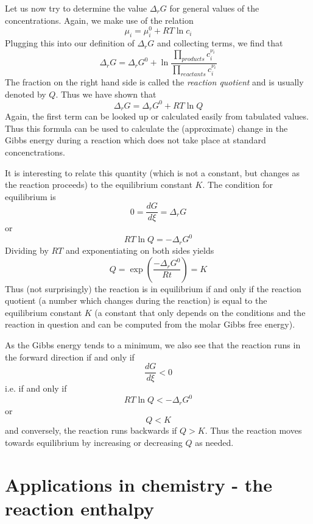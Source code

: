 \documentclass[a4paper, draft]{article}
\theoremstyle{own}
\theoremstyle{remark}
\begin{document}
Let us now try to determine the value $\Delta_r G$ for general values of the concentrations. Again, we make use of the relation
$$
\mu_i = \mu_i^0 + RT \ln c_i
$$
Plugging this into our definition of $\Delta_r G$ and collecting terms, we find that
$$
\Delta_r G = \Delta_r G^0 + \ln \frac{\prod_{products} c_i^{\nu_i}}{\prod_{reactants} c_i^{\nu_i}}
$$
The fraction on the right hand side is called the {\em reaction quotient} and is usually denoted by $Q$. Thus we have shown that
$$
\Delta_r G = \Delta_r G^0 + RT \ln Q
$$
Again, the first term can be looked up or calculated easily from tabulated values. Thus this formula can be used to calculate the (approximate) change in the Gibbs energy during a reaction which does not take place at standard concenctrations.

It is interesting to relate this quantity (which is not a constant, but changes as the reaction proceeds) to the equilibrium constant $K$. The condition for equilibrium is
$$
0 = \frac{dG}{d\xi} = \Delta_r G 
$$
or
$$
RT \ln Q = - \Delta_r G^0 
$$
Dividing by $RT$ and exponentiating on both sides yields
$$
Q = \exp(\frac{- \Delta_r G^0}{Rt}) = K
$$
Thus (not surprisingly) the reaction is in equilibrium if and only if the reaction quotient (a number which changes during the reaction) is equal to the equilibrium constant $K$ (a constant that only depends on the conditions and the reaction in question and can be computed from the molar Gibbs free energy).	

As the Gibbs energy tends to a minimum, we also see that the reaction runs in the forward direction if and only if
$$
\frac{dG}{d\xi} < 0
$$
i.e. if and only if
$$
RT \ln Q < - \Delta_r G^0 
$$
or
$$
Q < K
$$ 
and conversely, the reaction runs backwards if $Q > K$. Thus the reaction moves towards equilibrium by increasing or decreasing $Q$ as needed. 
	
\section{Applications in chemistry - the reaction enthalpy}
\end{document}
